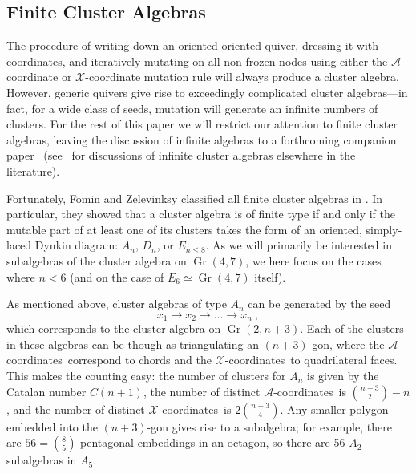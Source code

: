 \documentclass[11pt]{article}
\DeclareMathOperator{\Gr}{Gr}
\def\x{\mathcal{X}}
\def\xcoords{$\mathcal{X}$-coordinates}
\def\a{\mathcal{A}}
\def\acoords{$\mathcal{A}$-coordinates}
\begin{document}


\subsection{Finite Cluster Algebras}\label{sec:finite-algebras}

The procedure of writing down an oriented oriented quiver, dressing it with coordinates, and iteratively mutating on all non-frozen nodes using either the $\a$-coordinate or $\x$-coordinate mutation rule will always produce a cluster algebra. However, generic quivers give rise to exceedingly complicated cluster algebras---in fact, for a wide class of seeds, mutation will generate an infinite numbers of clusters. For the rest of this paper we will restrict our attention to finite cluster algebras, leaving the discussion of infinite algebras to a forthcoming companion paper~\cite{cluster_subalgebras_ii} (see~\cite{} for discussions of infinite cluster algebras elsewhere in the literature). 


Fortunately, Fomin and Zelevinksy classified all finite cluster algebras in \cite{1054.17024}. In particular, they showed that a cluster algebra is of finite type if and only if the mutable part of at least one of its clusters takes the form of an oriented, simply-laced Dynkin diagram: $A_n$, $D_n$, or $E_{n\le8}$.  As we will primarily be interested in subalgebras of the cluster algebra on $\Gr(4,7)$, we here focus on the cases where $n < 6$ (and on the case of $E_6 \simeq \Gr(4,7)$ itself). 

As mentioned above, cluster algebras of type $A_n$ can be generated by the seed
\begin{equation}\label{def:An}
  x_1\to x_2\to \ldots \to x_n \ ,
\end{equation}
which corresponds to the cluster algebra on $\Gr(2,n{+}3)$. Each of the clusters in these algebras can be though as triangulating an $(n+3)$-gon, where the \acoords\ correspond to chords and the \xcoords\ to quadrilateral faces. This makes the counting easy: the number of clusters for $A_n$ is given by the Catalan number $C(n+1)$, the number of distinct \acoords\ is $\binom{n+3}{2}-n$, and the number of distinct \xcoords\ is $2\binom{n+3}{4}$. Any smaller polygon embedded into the $(n+3)$-gon gives rise to a subalgebra; for example, there are $56=\binom{8}{5}$ pentagonal embeddings in an octagon, so there are 56 $A_2$ subalgebras in $A_5$. 
\end{document}
